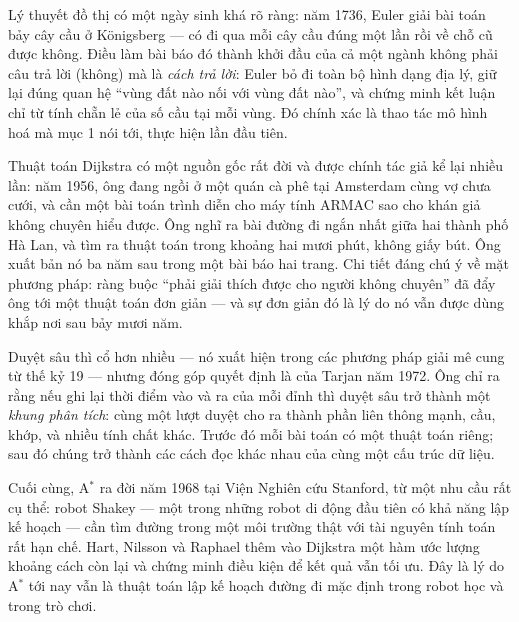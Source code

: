 \documentclass[../../algorithm.tex]{subfiles}
\begin{document}
Lý thuyết đồ thị có một ngày sinh khá rõ ràng: năm 1736, Euler giải bài toán bảy cây cầu ở Königsberg --- có đi qua mỗi cây cầu đúng một lần rồi về chỗ cũ được không. Điều làm bài báo đó thành khởi đầu của cả một ngành không phải câu trả lời (không) mà là \emph{cách trả lời}: Euler bỏ đi toàn bộ hình dạng địa lý, giữ lại đúng quan hệ ``vùng đất nào nối với vùng đất nào'', và chứng minh kết luận chỉ từ tính chẵn lẻ của số cầu tại mỗi vùng. Đó chính xác là thao tác mô hình hoá mà mục 1 nói tới, thực hiện lần đầu tiên.

Thuật toán Dijkstra có một nguồn gốc rất đời và được chính tác giả kể lại nhiều lần: năm 1956, ông đang ngồi ở một quán cà phê tại Amsterdam cùng vợ chưa cưới, và cần một bài toán trình diễn cho máy tính ARMAC sao cho khán giả không chuyên hiểu được. Ông nghĩ ra bài đường đi ngắn nhất giữa hai thành phố Hà Lan, và tìm ra thuật toán trong khoảng hai mươi phút, không giấy bút. Ông xuất bản nó ba năm sau trong một bài báo hai trang\cite{dijkstra1959}. Chi tiết đáng chú ý về mặt phương pháp: ràng buộc ``phải giải thích được cho người không chuyên'' đã đẩy ông tới một thuật toán đơn giản --- và sự đơn giản đó là lý do nó vẫn được dùng khắp nơi sau bảy mươi năm.

Duyệt sâu thì cổ hơn nhiều --- nó xuất hiện trong các phương pháp giải mê cung từ thế kỷ 19 --- nhưng đóng góp quyết định là của Tarjan năm 1972\cite{tarjan1972}. Ông chỉ ra rằng nếu ghi lại thời điểm vào và ra của mỗi đỉnh thì duyệt sâu trở thành một \emph{khung phân tích}: cùng một lượt duyệt cho ra thành phần liên thông mạnh, cầu, khớp, và nhiều tính chất khác. Trước đó mỗi bài toán có một thuật toán riêng; sau đó chúng trở thành các cách đọc khác nhau của cùng một cấu trúc dữ liệu.

Cuối cùng, A\(^\ast\) ra đời năm 1968 tại Viện Nghiên cứu Stanford, từ một nhu cầu rất cụ thể: robot Shakey --- một trong những robot di động đầu tiên có khả năng lập kế hoạch --- cần tìm đường trong một môi trường thật với tài nguyên tính toán rất hạn chế. Hart, Nilsson và Raphael thêm vào Dijkstra một hàm ước lượng khoảng cách còn lại và chứng minh điều kiện để kết quả vẫn tối ưu. Đây là lý do A\(^\ast\) tới nay vẫn là thuật toán lập kế hoạch đường đi mặc định trong robot học và trong trò chơi.
\end{document}
